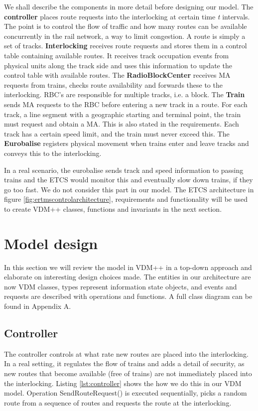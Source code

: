\documentclass[preprint,12pt]{elsarticle}
\begin{document}
We shall describe the components in more detail before designing our model. The \textbf{controller} places route requests into the interlocking at certain time \textit{t} intervals. The point is to control the flow of traffic and how many routes can be available concurrently in the rail network, a way to limit congestion. A route is simply a set of tracks. \textbf{Interlocking} receives route requests and stores them in a control table containing available routes. It receives track occupation events from physical units along the track side and uses this information to update the control table with available routes. The \textbf{RadioBlockCenter} receives MA requests from trains, checks route availability and forwards these to the interlocking. RBC's are responsible for multiple tracks, i.e. a block. The \textbf{Train} sends MA requests to the RBC before entering a new track in a route. For each track, a line segment with a geographic starting and terminal point, the train must request and obtain a MA. This is also stated in the requirements. Each track has a certain speed limit, and the train must never exceed this. The \textbf{Eurobalise} registers physical movement when trains enter and leave tracks and conveys this to the interlocking. 

In a real scenario, the eurobalise sends track and speed information to passing trains and the ETCS would monitor this and eventually slow down trains, if they go too fast. We do not consider this part in our model. The ETCS architecture in figure \ref{fig:ertmscontrolarchitecture}, requirements and functionality will be used to create VDM++ classes, functions and invariants in the next section.

\section{Model design}

In this section we will review the model in VDM++ in a top-down approach and elaborate on interesting design choices made. The entities in our architecture are now VDM classes, types represent information state objects, and events and requests are described with operations and functions. A full class diagram can be found in Appendix A.

\subsection{Controller}

The controller controls at what rate new routes are placed into the interlocking. In a real setting, it regulates the flow of trains and adds a detail of security, as new routes that become available (free of trains) are not immediately placed into the interlocking. Listing \ref{lst:controller} shows the how we do this in our VDM model. Operation SendRouteRequest() is executed sequentially, picks a random route from a sequence of routes and requests the route at the interlocking.
\end{document}
